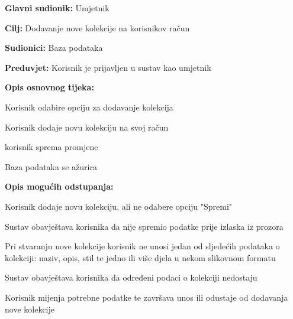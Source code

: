 					\noindent {}
					\begin{packed_item}
						
						\item \textbf{Glavni sudionik: }Umjetnik
						\item  \textbf{Cilj:} Dodavanje nove kolekcije na korisnikov račun
						\item  \textbf{Sudionici:} Baza podataka
						\item  \textbf{Preduvjet:} Korisnik je prijavljen u sustav kao umjetnik
						\item  \textbf{Opis osnovnog tijeka:}
						
						\item[] \begin{packed_enum}
							
							\item Korisnik odabire opciju za dodavanje kolekcija
							\item Korisnik dodaje novu kolekciju na svoj račun
							\item korisnik sprema promjene
							\item Baza podataka se ažurira					
						\end{packed_enum}
						
						\item  \textbf{Opis mogućih odstupanja:}
						
						\item[] \begin{packed_item}
							
							\item[2.a] Korisnik dodaje novu kolekciju, ali ne odabere opciju "Spremi"
							\item[] \begin{packed_enum}
								
								\item Sustav obavještava korisnika da nije spremio podatke prije izlaska iz prozora
								
							\end{packed_enum}
						
							\item[2.b] Pri stvaranju nove kolekcije korisnik ne unosi jedan od sljedećih podataka o kolekciji:
							naziv, opis, stil te jedno ili više djela u nekom slikovnom formatu
							\item[] \begin{packed_enum}
								
								\item Sustav obavještava korisnika da određeni podaci o kolekciji nedostaju
								\item Korisnik mijenja potrebne podatke te završava 
								unos ili odustaje od dodavanja nove kolekcije
							\end{packed_enum}
							
						\end{packed_item}
					\end{packed_item}
					

